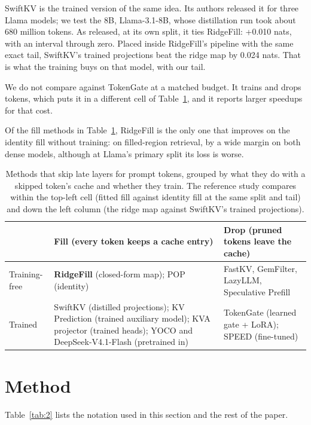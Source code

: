\documentclass[11pt]{article}
\begin{document}
SwiftKV is the trained version of the same idea. Its authors released it for three Llama models; we test the 8B, Llama-3.1-8B, whose distillation run took about 680 million tokens. As released, at its own split, it ties RidgeFill: +0.010 nats, with an interval through zero. Placed inside RidgeFill's pipeline with the same exact tail, SwiftKV's trained projections beat the ridge map by 0.024 nats. That is what the training buys on that model, with our tail.

We do not compare against TokenGate at a matched budget. It trains and drops tokens, which puts it in a different cell of Table~\ref{tab:1}, and it reports larger speedups for that cost.

Of the fill methods in Table~\ref{tab:1}, RidgeFill is the only one that improves on the identity fill without training: on filled-region retrieval, by a wide margin on both dense models, although at Llama's primary split its loss is worse.

\begin{table}[!htbp]
\centering
\caption{Methods that skip late layers for prompt tokens, grouped by what they do with a skipped token's cache and whether they train. The reference study compares within the top-left cell (fitted fill against identity fill at the same split and tail) and down the left column (the ridge map against SwiftKV's trained projections).}\label{tab:1}
\footnotesize
\setlength{\tabcolsep}{4pt}
\begin{tabularx}{\linewidth}{l>{\raggedright\arraybackslash\hsize=1.157\hsize}X>{\raggedright\arraybackslash\hsize=0.843\hsize}X}
\toprule
 & Fill (every token keeps a cache entry) & Drop (pruned tokens leave the cache) \\
\midrule
Training-free & \textbf{RidgeFill} (closed-form map); POP (identity) & FastKV, GemFilter, LazyLLM, Speculative Prefill \\
Trained & SwiftKV (distilled projections); KV Prediction (trained auxiliary model); KVA projector (trained heads); YOCO and DeepSeek-V4.1-Flash (pretrained in) & TokenGate (learned gate + LoRA); SPEED (fine-tuned) \\
\bottomrule
\end{tabularx}
\end{table}


\section{Method}\label{sec:2}
Table~\ref{tab:2} lists the notation used in this section and the rest of the paper.
\end{document}
